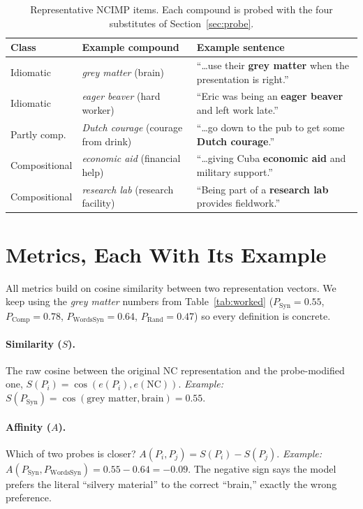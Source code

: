 \documentclass[11pt]{article}
\newcommand{\Syn}{P_{\mathrm{Syn}}}
\newcommand{\Comp}{P_{\mathrm{Comp}}}
\newcommand{\Words}{P_{\mathrm{WordsSyn}}}
\newcommand{\Rand}{P_{\mathrm{Rand}}}
\begin{document}
\begin{table}[H]
\centering
\small
\begin{tabular}{lll}
\toprule
Class & Example compound & Example sentence \\
\midrule
Idiomatic & \emph{grey matter} (brain) & ``\dots use their \textbf{grey matter} when the presentation is right.'' \\
Idiomatic & \emph{eager beaver} (hard worker) & ``Eric was being an \textbf{eager beaver} and left work late.'' \\
Partly comp. & \emph{Dutch courage} (courage from drink) & ``\dots go down to the pub to get some \textbf{Dutch courage}.'' \\
Compositional & \emph{economic aid} (financial help) & ``\dots giving Cuba \textbf{economic aid} and military support.'' \\
Compositional & \emph{research lab} (research facility) & ``Being part of a \textbf{research lab} provides fieldwork.'' \\
\bottomrule
\end{tabular}
\caption{Representative NCIMP items. Each compound is probed with the four substitutes of
Section~\ref{sec:probe}.}
\label{tab:data}
\end{table}

\section{Metrics, Each With Its Example}
\label{sec:metrics}

All metrics build on cosine similarity between two representation vectors. We keep using the
\emph{grey matter} numbers from Table~\ref{tab:worked} ($\Syn=0.55$, $\Comp=0.78$, $\Words=0.64$,
$\Rand=0.47$) so every definition is concrete.

\paragraph{Similarity ($S$).} The raw cosine between the original NC representation and the
probe-modified one, $S(P_i) = \cos(e(P_i), e(\mathrm{NC}))$. \emph{Example:} $S(\Syn)=\cos(\text{grey
matter},\text{brain})=0.55$.

\paragraph{Affinity ($A$).} Which of two probes is closer? $A(P_i,P_j)=S(P_i)-S(P_j)$. \emph{Example:}
$A(\Syn,\Words)=0.55-0.64=-0.09$. The negative sign says the model prefers the literal ``silvery
material'' to the correct ``brain,'' exactly the wrong preference.
\end{document}
